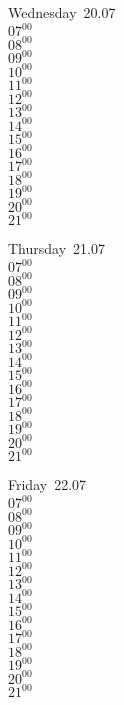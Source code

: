 \documentclass[11pt,a4paper]{book}\usepackage[]{graphicx}\usepackage[]{color}
\begin{document}
\begin{weekdaybox}
  Wednesday~20.07\\
  { 
  \vfill
  $07^{00}$\\
$08^{00}$\\
$09^{00}$\\
$10^{00}$\\
$11^{00}$\\
$12^{00}$\\
$13^{00}$\\
$14^{00}$\\
$15^{00}$\\
$16^{00}$\\
$17^{00}$\\
$18^{00}$\\
$19^{00}$\\
$20^{00}$\\
$21^{00}$\\
  }
\end{weekdaybox}
\clearpage
\begin{headerbox}
\end{headerbox}
\begin{weekdaybox}
  Thursday~21.07\\
  { 
  \vfill
  $07^{00}$\\
$08^{00}$\\
$09^{00}$\\
$10^{00}$\\
$11^{00}$\\
$12^{00}$\\
$13^{00}$\\
$14^{00}$\\
$15^{00}$\\
$16^{00}$\\
$17^{00}$\\
$18^{00}$\\
$19^{00}$\\
$20^{00}$\\
$21^{00}$\\
  }
\end{weekdaybox} 
\begin{weekdaybox}
  Friday~22.07\\
  { 
  \vfill
  $07^{00}$\\
$08^{00}$\\
$09^{00}$\\
$10^{00}$\\
$11^{00}$\\
$12^{00}$\\
$13^{00}$\\
$14^{00}$\\
$15^{00}$\\
$16^{00}$\\
$17^{00}$\\
$18^{00}$\\
$19^{00}$\\
$20^{00}$\\
$21^{00}$\\
  }
\end{weekdaybox}
\end{document}
